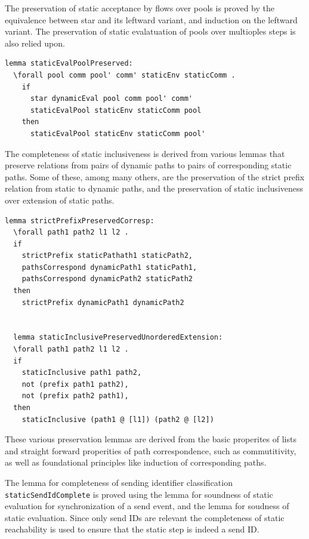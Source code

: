\documentclass[10pt]{article}
\begin{document}
The preservation of static acceptance by flows over pools is proved by the
equivalence between star and its leftward variant, and induction on the leftward variant.
The preservation of static evalatuation of pools over multioples steps is also relied upon.

\begin{lstlisting}[language=logic, mathescape]
  lemma staticEvalPoolPreserved:
  \forall pool comm pool' comm' staticEnv staticComm .
    if
      star dynamicEval pool comm pool' comm' 
      staticEvalPool staticEnv staticComm pool
    then
      staticEvalPool staticEnv staticComm pool'
\end{lstlisting}

The completeness of static inclusiveness is derived from various lemmas that
preserve relations from pairs of dynamic paths to pairs of corresponding static paths.  
Some of these, among many others, are
the preservation of the strict prefix relation from static to dynamic paths,
and the preservation of static inclusiveness over extension of static paths.

\begin{lstlisting}[language=logic, mathescape]
  lemma strictPrefixPreservedCorresp:
  \forall path1 path2 l1 l2 .
  if
    strictPrefix staticPathath1 staticPath2, 
    pathsCorrespond dynamicPath1 staticPath1,
    pathsCorrespond dynamicPath2 staticPath2
  then
    strictPrefix dynamicPath1 dynamicPath2


  lemma staticInclusivePreservedUnorderedExtension:
  \forall path1 path2 l1 l2 .
  if
    staticInclusive path1 path2, 
    not (prefix path1 path2),
    not (prefix path2 path1), 
  then
    staticInclusive (path1 @ [l1]) (path2 @ [l2])
\end{lstlisting}

These various preservation lemmas are derived from the basic properites of lists 
and straight forward properities of path correspondence, such as commutitivity, as
well as foundational principles like induction of corresponding paths.

The lemma for completeness of sending identifier classification \lstinline{staticSendIdComplete}
is proved using the lemma for
soundness of static evaluation for synchronization of a send event,
and the lemma for soudness of static evaluation.
Since only send IDs are relevant the completeness of static reachability is
used to ensure that the static step is indeed a send ID. 
\end{document}
